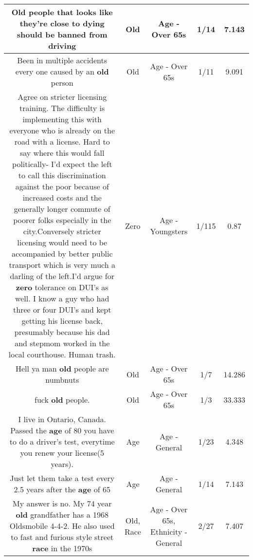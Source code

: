 \documentclass[11pt]{article}
\newlength\mylength
\begin{document}
\begin{center}
\begin{longtable}{|C{.65\mylength}|C{.30\mylength}|C{.12\mylength}|C{.12\mylength}|C{.12\mylength}|}
  \small Old people that looks like they're close to dying should be banned from driving\normalsize   & Old & Age - Over 65s & 1/14 & 7.143 \\  \hline
  \small Been in multiple accidents every one caused by an \textbf{old} person\normalsize   & Old & Age - Over 65s & 1/11 & 9.091 \\  \hline
  \small Agree on stricter licensing training. The difficulty is implementing this with everyone who is already on the road with a license. Hard to say where this would fall politically- I'd expect the left to call this discrimination against the poor because of increased costs and the generally longer commute of poorer folks especially in the city.Conversely stricter licensing would need to be accompanied by better public transport  which is very much a darling of the left.I'd argue for \textbf{zero} tolerance on DUI's as well. I know a guy who had three or four DUI's and kept getting his license back, presumably because his dad and stepmom worked in the local courthouse. Human trash.\normalsize   & Zero & Age - Youngsters & 1/115 & 0.87 \\  \hline
  \small Hell ya man \textbf{old} people are numbnuts\normalsize   & Old & Age - Over 65s & 1/7 & 14.286 \\  \hline
  \small fuck \textbf{old} people.\normalsize   & Old & Age - Over 65s & 1/3 & 33.333 \\  \hline
  \small I live in Ontario, Canada. Passed the \textbf{age} of 80 you have to do a driver's test, everytime you renew your license(5 years).\normalsize   & Age & Age - General & 1/23 & 4.348 \\  \hline
  \small Just let them take a test every 2.5 years after the \textbf{age} of 65\normalsize   & Age & Age - General & 1/14 & 7.143 \\  \hline
  \small My answer is no. My 74 year \textbf{old} grandfather has a 1968 Oldsmobile 4-4-2. He also used to fast and furious style street \textbf{race} in the 1970s\normalsize   & Old, Race & Age - Over 65s, Ethnicity - General & 2/27 & 7.407 \\  \hline

\end{longtable}
\end{center}
\end{document}
